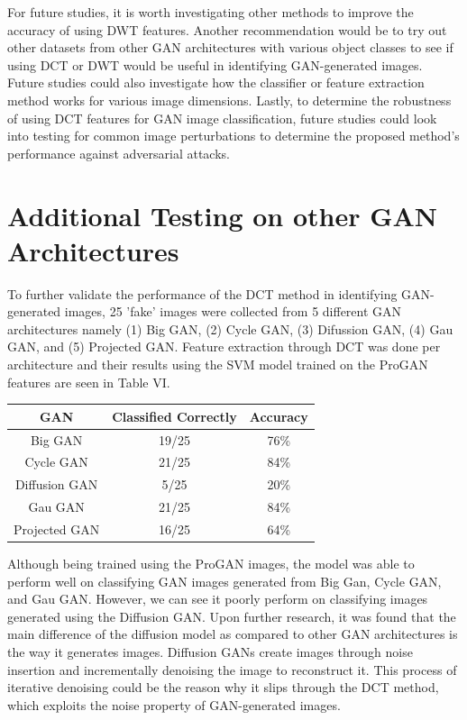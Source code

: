 \documentclass[journal]{./IEEE/IEEEtran}
\begin{document}
For future studies, it is worth investigating other methods to improve the accuracy of using DWT features. Another recommendation would be to try out other datasets from other GAN architectures with various object classes to see if using DCT or DWT would be useful in identifying GAN-generated images. Future studies could also investigate how the classifier or feature extraction method works for various image dimensions. Lastly, to determine the robustness of using DCT features for GAN image classification, future studies could look into testing for common image perturbations to determine the proposed method's performance against adversarial attacks. 




\appendices

\section{Additional Testing on other GAN Architectures}
To further validate the performance of the DCT method in identifying GAN-generated images, 25 'fake' images were collected from 5 different GAN architectures namely (1) Big GAN, (2) Cycle GAN, (3) Difussion GAN, (4) Gau GAN, and (5) Projected GAN. Feature extraction through DCT was done per architecture and their results using the SVM model trained on the ProGAN features are seen in Table VI.

\begin{table}[H]
\centering
\begin{tabular}{|c|c|c|}
\hline
GAN           & Classified Correctly & Accuracy \\ \hline
Big GAN       & 19/25                & 76\%     \\ \hline
Cycle GAN     & 21/25                & 84\%     \\ \hline
Diffusion GAN & 5/25                 & 20\%     \\ \hline
Gau GAN       & 21/25                & 84\%     \\ \hline
Projected GAN & 16/25                & 64\%     \\ \hline
\end{tabular}
\end{table}


Although being trained using the ProGAN images, the model was able to perform well on classifying GAN images generated from Big Gan, Cycle GAN, and Gau GAN. However, we can see it poorly perform on classifying images generated using the Diffusion GAN. Upon further research, it was found that the main difference of the diffusion model as compared to other GAN architectures is the way it generates images. Diffusion GANs create images through noise insertion and incrementally denoising the image to reconstruct it. This process of iterative denoising could be the reason why it slips through the DCT method, which exploits the noise property of GAN-generated images.  
\end{document}
